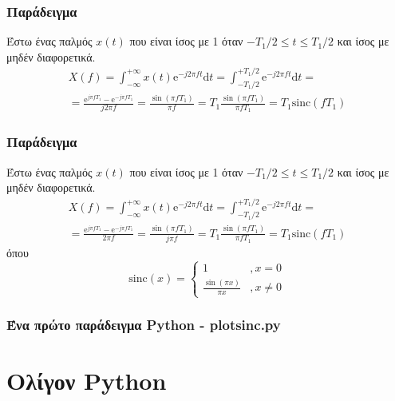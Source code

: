 \documentclass[9pt]{beamer}
\begin{document}
	\begin{frame}
		\frametitle{Παράδειγμα}
		Έστω ένας παλμός $x(t)$ που είναι ίσος με 1 όταν $-T_1/2\le t\le T_1/2$ και ίσος με μηδέν διαφορετικά.
		\begin{multline}
		X(f) = \int_{-\infty}^{+\infty}x(t)\mathrm{e}^{-j2\pi ft}\mathrm{d}t 
		=\int_{-T_1/2}^{+T_1/2}\mathrm{e}^{-j2\pi ft}\mathrm{d}t = \\ 
		=\frac{\mathrm{e}^{j\pi fT_1} - \mathrm{e}^{-j\pi fT_1}}{j2\pi f}
		=\frac{\sin(\pi fT_1)}{\pi f} = T_1 \frac{\sin(\pi fT_1)}{\pi fT_1} 
		=T_1 \mathrm{sinc}(fT_1)
		\end{multline}				
	\end{frame}
	\begin{frame}
	\frametitle{Παράδειγμα}
		Έστω ένας παλμός $x(t)$ που είναι ίσος με 1 όταν $-T_1/2\le t\le T_1/2$ και ίσος με μηδέν διαφορετικά.
		\begin{multline}
		X(f) = \int_{-\infty}^{+\infty}x(t)\mathrm{e}^{-j2\pi ft}\mathrm{d}t 
		=\int_{-T_1/2}^{+T_1/2}\mathrm{e}^{-j2\pi ft}\mathrm{d}t = \\ 
		=\frac{\mathrm{e}^{j\pi fT_1} - \mathrm{e}^{-j\pi fT_1}}{2\pi f}
		=\frac{\sin(\pi fT_1)}{j\pi f} = T_1 \frac{\sin(\pi fT_1)}{\pi fT_1} 
		=T_1 \mathrm{sinc}(fT_1)
		\end{multline}			
		όπου
		\begin{equation}
		\mathrm{sinc}(x) = \left\{
			\begin{array}{ll}
			1 & ,x=0 \\
			\frac{\sin(\pi x)}{\pi x} & ,x\neq 0 
			\end{array}
		\right.
		\end{equation}	
	\end{frame}
	\begin{frame}
		\frametitle{Ένα πρώτο παράδειγμα Python - plotsinc.py}
		
	\end{frame}

	\section{Ολίγον Python}
	
\end{document}
